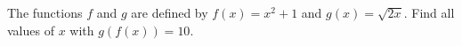 The functions $f$ and $g$ are defined by $f(x)=x^2+1$ and $g(x)=\sqrt{2x}$. Find all values of $x$ with $g(f(x))=10$.
